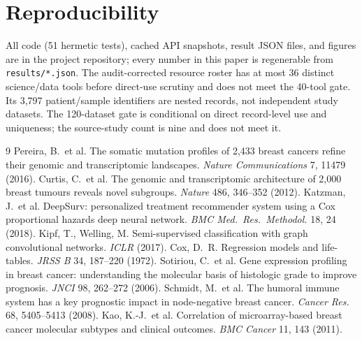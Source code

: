 \documentclass[12pt,a4paper]{article}
\begin{document}
\section{Reproducibility}
All code (51 hermetic tests), cached API snapshots, result JSON files, and
figures are in the project repository; every number in this paper is
regenerable from \texttt{results/*.json}.
The audit-corrected resource roster has at most 36 distinct science/data
tools before direct-use scrutiny and does not meet the 40-tool gate. Its
3,797 patient/sample identifiers are nested records, not independent
study datasets. The 120-dataset gate is conditional on direct record-level
use and uniqueness; the source-study count is nine and does not meet it.

\begin{thebibliography}{9}
 Pereira, B.\ et al. The somatic mutation profiles of
2,433 breast cancers refine their genomic and transcriptomic landscapes.
\emph{Nature Communications} 7, 11479 (2016).
 Curtis, C.\ et al. The genomic and transcriptomic
architecture of 2,000 breast tumours reveals novel subgroups.
\emph{Nature} 486, 346--352 (2012).
 Katzman, J.\ et al. DeepSurv: personalized treatment
recommender system using a Cox proportional hazards deep neural network.
\emph{BMC Med.\ Res.\ Methodol.} 18, 24 (2018).
 Kipf, T., Welling, M. Semi-supervised classification with
graph convolutional networks. \emph{ICLR} (2017).
 Cox, D.\ R. Regression models and life-tables.
\emph{JRSS B} 34, 187--220 (1972).
 Sotiriou, C.\ et al. Gene expression profiling in
breast cancer: understanding the molecular basis of histologic grade to
improve prognosis. \emph{JNCI} 98, 262--272 (2006).
 Schmidt, M.\ et al. The humoral immune system has a
key prognostic impact in node-negative breast cancer. \emph{Cancer Res.}
68, 5405--5413 (2008).
 Kao, K.-J.\ et al. Correlation of microarray-based breast
cancer molecular subtypes and clinical outcomes. \emph{BMC Cancer} 11, 143
(2011).
\end{thebibliography}
\end{document}
